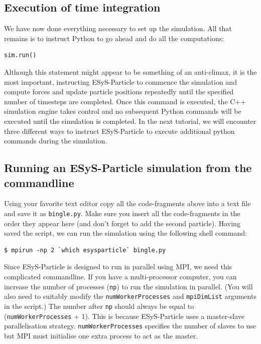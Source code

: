 \subsection{Execution of time integration}

We have now done everything necessary to set up the simulation. All that remains is to instruct Python to go ahead and do all the computations:

\begin{verbatim}
sim.run()
\end{verbatim}

\noindent
Although this statement might appear to be something of an anti-climax, it is the most important, instructing ESyS-Particle to commence the simulation and compute forces and update particle positions repeatedly until the specified number of timesteps are completed. Once this command is executed, the C++ simulation engine takes control and no subsequent Python commands will be executed until the simulation is completed. In the next tutorial, we will encounter three different ways to instruct ESyS-Particle to execute additional python commands during the simulation.

\subsection{Running an ESyS-Particle simulation from the commandline}

Using your favorite text editor copy all the code-fragments above into a text file and save it as \texttt{bingle.py}. Make sure you insert all the code-fragments in the order they appear here (and don't forget to add the second particle). Having saved the script, we can run the simulation using the following shell command:

\begin{verbatim}
$ mpirun -np 2 `which esysparticle` bingle.py
\end{verbatim}

Since ESyS-Particle is designed to run in parallel using MPI, we need this complicated commandline. If you have a multi-processor computer, you can increase the number of processes (\texttt{np}) to run the simulation in parallel. (You will also need to suitably modify the \texttt{numWorkerProcesses} and \texttt{mpiDimList} arguments in the script.) The number after \texttt{np} should always be equal to (\texttt{numWorkerProcesses} + 1). This is because ESyS-Particle uses a master-slave parallelisation strategy. \texttt{numWorkerProcesses} specifies the number of slaves to use but MPI must initialise one extra process to act as the master.


